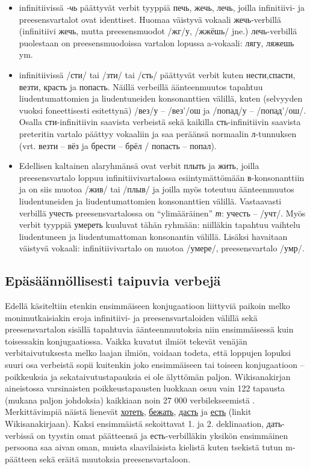 \documentclass[]{scrartcl}
\providecommand{\tightlist}{%
  \setlength{\itemsep}{0pt}\setlength{\parskip}{0pt}}
\begin{document}
\begin{itemize}
\tightlist
\item
  infinitiivissä \emph{-чь} päättyvät verbit tyyppiä печь, жечь, лечь,
  joilla infinitiivi- ja preesensvartalot ovat identtiset. Huomaa
  väistyvä vokaali жечь-verbillä (infinitiivi жечь, mutta preesensmuodot
  /жг/у, /жжёшь/ jne.) лечь-verbillä puolestaan on preesensmuodoissa
  vartalon lopussa a-vokaali: лягу, ляжешь ym.
\item
  infinitiivissä /сти/ tai /зти/ tai /сть/ päättyvät verbit kuten
  нести,спасти, везти, красть ja попасть. Näillä verbeillä äänteenmuutos
  tapahtuu liudentumattomien ja liudentuneiden konsonanttien välillä,
  kuten (selvyyden vuoksi foneettisesti esitettynä) /вез/у -- /вез'/ош
  ja /попад/у -- /попад'/ош/. Osalla сти-infinitiivin saavista verbeistä
  sekä kaikilla сть-infinitiivin saavista preteritin vartalo päättyy
  vokaaliin ja saa peräänsä normaalin л-tunnuksen (vrt. везти -- вёз ja
  брести -- брёл / попасть -- попал).
\item
  Edellisen kaltainen alaryhmänsä ovat verbit плыть ja жить, joilla
  preesensvartalo loppuu infinitiivivartalossa esiintymättömään
  в-konsonanttiin ja on siis muotoa /жив/ tai /плыв/ ja joilla myös
  toteutuu äänteenmuutos liudentuneiden ja liudentumattomien
  konsonanttien välillä. Vastaavasti verbillä учесть preesensvartalossa
  on ``ylimääräinen'' \emph{т}: учесть -- /учт/. Myös verbit tyyppiä
  умереть kuuluvat tähän ryhmään: niilläkin tapahtuu vaihtelu
  liudentuneen ja liudentumattoman konsonantin välillä. Lisäksi
  havaitaan väistyvä vokaali: infinitiivivartalo on muotoa /умере/,
  preesensvartalo /умр/.
\end{itemize}

\subsection{Epäsäännöllisesti taipuvia
verbejä}\label{epuxe4suxe4uxe4nnuxf6llisesti-taipuvia-verbejuxe4}

Edellä käsiteltiin etenkin ensimmäiseen konjugaatioon liittyviä paikoin
melko monimutkaisiakin eroja infinitiivi- ja preesensvartaloiden välillä
sekä preesensvartalon sisällä tapahtuvia äänteenmuutoksia niin
ensimmäisessä kuin toisessakin konjugaatiossa. Vaikka kuvatut ilmiöt
tekevät venäjän verbitaivutuksesta melko laajan ilmiön, voidaan todeta,
että loppujen lopuksi suuri osa verbeistä sopii kuitenkin joko
ensimmäiseen tai toiseen konjugaatioon -- poikkeuksia ja
sekataivutustapauksia ei ole älyttömän paljon. Wikisanakirjan
aineistossa varsinaisten poikkeustapausten luokkaan osuu vain 122
tapausta (mukana paljon johdoksia) kaikkiaan noin 27 000
verbilekseemistä . Merkittävimpiä näistä lienevät
\href{http://ru.wiktionary.org/wiki/хотеть}{хотеть},
\href{http://ru.wiktionary.org/wiki/бежать}{бежать},
\href{http://ru.wiktionary.org/wiki/дасть}{дасть} ja
\href{http://ru.wiktionary.org/wiki/есть}{есть} (linkit
Wikisanakirjaan). Kaksi ensimmäistä sekoittavat 1. ja 2. deklinaation,
дать-verbissä on tyystin omat päätteensä ja есть-verbilläkin yksikön
ensimmäinen persoona saa aivan oman, muista slaavilaisista kielistä
kuten tsekistä tutun m-päätteen sekä eräitä muutoksia preesensvartaloon.
\end{document}
